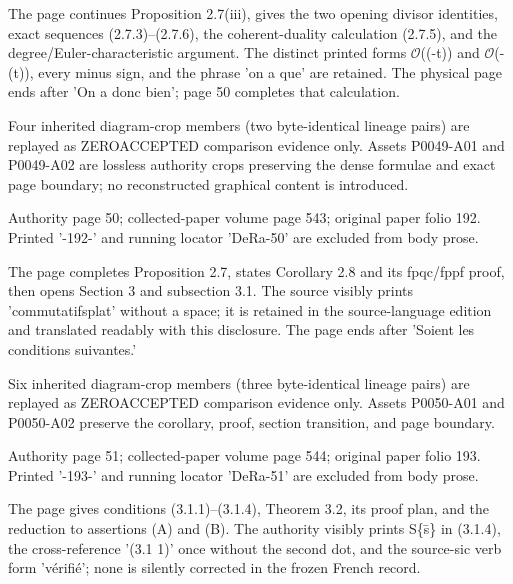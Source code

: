 \documentclass[11pt,a4paper]{article}
\begin{document}
The page continues Proposition 2.7(iii), gives the two opening divisor identities, exact sequences (2.7.3)--(2.7.6), the coherent-duality calculation (2.7.5), and the degree/Euler-characteristic argument. The distinct printed forms \ensuremath{\mathcal{O}}((-t)) and \ensuremath{\mathcal{O}}(-(t)), every minus sign, and the phrase 'on a que' are retained. The physical page ends after 'On a donc bien'; page 50 completes that calculation.

Four inherited diagram-crop members (two byte-identical lineage pairs) are replayed as ZERO\textunderscore{}ACCEPTED comparison evidence only. Assets P0049-A01 and P0049-A02 are lossless authority crops preserving the dense formulae and exact page boundary; no reconstructed graphical content is introduced.


\par\medskip
\hypertarget{D018-P0050}{}
\par\smallskip
Authority page 50; collected-paper volume page 543; original paper folio 192. Printed '-192-' and running locator 'DeRa-50' are excluded from body prose.

The page completes Proposition 2.7, states Corollary 2.8 and its fpqc/fppf proof, then opens Section 3 and subsection 3.1. The source visibly prints 'commutatifsplat' without a space; it is retained in the source-language edition and translated readably with this disclosure. The page ends after 'Soient les conditions suivantes.'

Six inherited diagram-crop members (three byte-identical lineage pairs) are replayed as ZERO\textunderscore{}ACCEPTED comparison evidence only. Assets P0050-A01 and P0050-A02 preserve the corollary, proof, section transition, and page boundary.


\par\medskip
\hypertarget{D018-P0051}{}
\par\smallskip
Authority page 51; collected-paper volume page 544; original paper folio 193. Printed '-193-' and running locator 'DeRa-51' are excluded from body prose.

The page gives conditions (3.1.1)--(3.1.4), Theorem 3.2, its proof plan, and the reduction to assertions (A) and (B). The authority visibly prints S\textunderscore{}\{s̄\} in (3.1.4), the cross-reference '(3.1 1)' once without the second dot, and the source-sic verb form 'vérifié'; none is silently corrected in the frozen French record.
\end{document}
